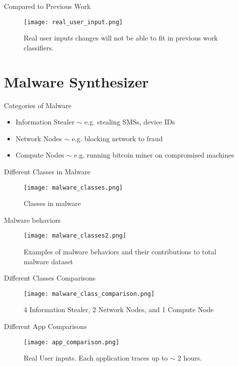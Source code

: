 \documentclass{beamer}
\begin{document}
\begin{frame}{Compared to Previous Work}
	\begin{figure}
		\centering
		\texttt{[image: real\_user\_input.png]}
		\caption{Real user inputs changes will not be able to fit in previous
			work classifiers.}
	\end{figure}
\end{frame}

\section{Malware Synthesizer}

\begin{frame}{Categories of Malware}
	\begin{itemize}
		\item Information Stealer $\sim$ e.g. stealing SMSs, device IDs
		\item Network Nodes $\sim$ e.g. blocking network to fraud
		\item Compute Nodes $\sim$ e.g. running bitcoin miner on compromised machines
	\end{itemize}
\end{frame}

\begin{frame}{Different Classes in Malware}
	\begin{figure}
		\centering
		\texttt{[image: malware\_classes.png]}
		\caption{Classes in malware}
	\end{figure}
\end{frame}

\begin{frame}{Malware behaviors}
	\begin{figure}
		\centering
		\texttt{[image: malware\_classes2.png]}
		\caption{Examples of malware behaviors and their contributions to total
		malware dataset}
	\end{figure}
\end{frame}

\begin{frame}{Different Classes Comparisons}
	\begin{figure}
		\centering
		\texttt{[image: malware\_class\_comparison.png]}
		\caption{4 Information Stealer, 2 Network Nodes, and 1 Compute Node}
	\end{figure}
\end{frame}

\begin{frame}{Different App Comparisons}
	\begin{figure}
		\centering
		\texttt{[image: app\_comparison.png]}
		\caption{Real User inputs. Each application traces up to $\sim$ 2 hours.}
	\end{figure}
\end{frame}
\end{document}
